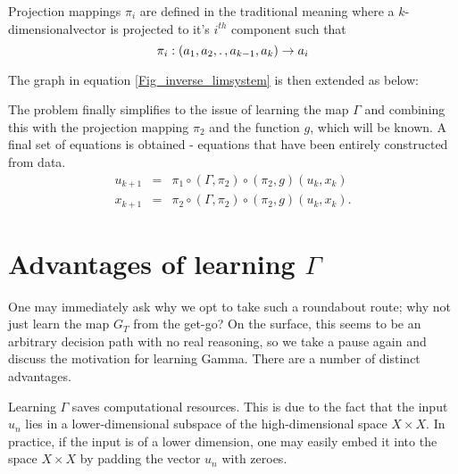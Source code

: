 \documentclass[a4paper,12pt,twoside]{book}
\newtheorem{Definition}{Definition}[]
\begin{document}
Projection mappings $\pi_i$ are defined in the traditional meaning where a $k$-dimensionalvector is projected to it's $i^{th}$ component such that $$\pi_i:(a_1,a_2, \ldotp, a_{k-1}, a_k)\to{a_i}$$


The graph in equation \ref{Fig_inverse_limsystem} is then extended as below:

\begin{figure}[ht] \label{Fig_Gamma}
  \centering
  \label{fig:conjugacy_with_Gamma}
\end{figure}

The problem finally simplifies to the issue of learning the map $\Gamma$ and combining this with the projection mapping $\pi_2$ and the function $g$, which will be known. A final set of equations is obtained - equations that have been entirely constructed from data.
\begin{eqnarray}
	u_{k+1} &=& \pi_1 \circ (\Gamma, \pi_2) \circ (\pi_2,g) (u_k,x_k) \label{Seqn_u}\\
	x_{k+1} &=& \pi_2 \circ (\Gamma, \pi_2) \circ (\pi_2,g) (u_k,x_k). \label{Seqn_x}
\end{eqnarray}



\section{Advantages of learning $\Gamma$} \label{subs_LearnGamma}

One may immediately ask why we opt to take such a roundabout route; why not just learn the map $G_T$ from the get-go? On the surface, this seems to be an arbitrary decision path with no real reasoning, so we take a pause again and discuss the motivation for learning Gamma.
There are a number of distinct advantages. 

Learning $\Gamma$ saves computational resources. This is due to the fact that the input $u_n$ lies in a lower-dimensional subspace of the high-dimensional space $X\times{X}$. In practice, if the input is of a  lower dimension, one may easily embed it into the space $X\times{X}$ by padding the vector $u_n$ with zeroes.
\end{document}
